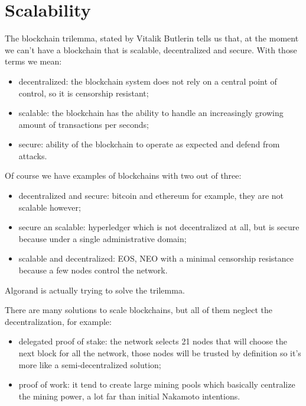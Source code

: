 \section{Scalability}

The blockchain trilemma, stated by Vitalik Butlerin tells us that, at the moment we can't have a blockchain that is scalable, decentralized and secure.
With those terms we mean:
\begin{itemize}
    \item decentralized: the blockchain system does not rely on a central point of control, so it is censorship resistant;
    \item scalable: the blockchain has the ability to handle an increasingly growing amount of transactions per seconds;
    \item secure: ability of the blockchain to operate as expected and defend from attacks.
\end{itemize}

Of course we have examples of blockchains with two out of three:
\begin{itemize}
    \item decentralized and secure: bitcoin and ethereum for example, they are not scalable however;

    \item secure an scalable: hyperledger which is not decentralized at all, but is secure because under a single administrative domain;

    \item scalable and decentralized: EOS, NEO with a minimal censorship resistance because a few nodes control the network.
\end{itemize}
Algorand is actually trying to solve the trilemma.

There are many solutions to scale blockchains, but all of them neglect the decentralization, for example:
\begin{itemize}
    \item delegated proof of stake: the network selects 21 nodes that will choose the next block for all the network, those nodes will be trusted by definition so it's more like a semi-decentralized solution;

    \item proof of work: it tend to create large mining pools which basically centralize the mining power, a lot far than initial Nakamoto intentions.
\end{itemize}

